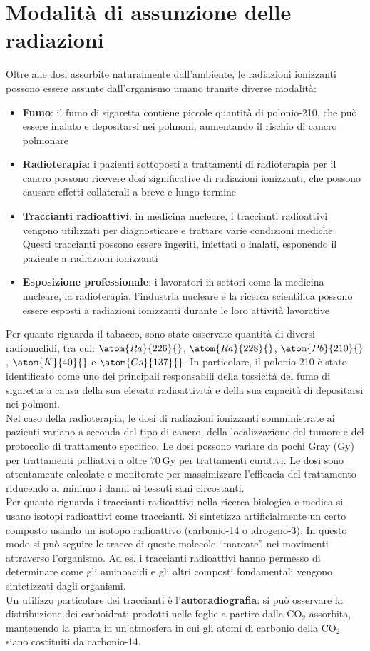 \section{Modalità di assunzione delle radiazioni}
Oltre alle dosi assorbite naturalmente dall'ambiente, le radiazioni ionizzanti possono essere assunte dall'organismo umano tramite diverse modalità:
\begin{itemize}
    \item \textbf{Fumo}: il fumo di sigaretta contiene piccole quantità di polonio-210, che può essere inalato e depositarsi nei polmoni, aumentando il rischio di cancro polmonare
    \item \textbf{Radioterapia}: i pazienti sottoposti a trattamenti di radioterapia per il cancro possono ricevere dosi significative di radiazioni ionizzanti, che possono causare effetti collaterali a breve e lungo termine
    \item \textbf{Traccianti radioattivi}: in medicina nucleare, i traccianti radioattivi vengono utilizzati per diagnosticare e trattare varie condizioni mediche. Questi traccianti possono essere ingeriti, iniettati o inalati, esponendo il paziente a radiazioni ionizzanti
    \item \textbf{Esposizione professionale}: i lavoratori in settori come la medicina nucleare, la radioterapia, l'industria nucleare e la ricerca scientifica possono essere esposti a radiazioni ionizzanti durante le loro attività lavorative
\end{itemize}
Per quanto riguarda il tabacco, sono state osservate quantità di diversi radionuclidi, tra cui: $\atom{Ra}{226}{}$, $\atom{Ra}{228}{}$, $\atom{Pb}{210}{}$, $\atom{K}{40}{}$ e $\atom{Cs}{137}{}$. In particolare, il polonio-210 è stato identificato come uno dei principali responsabili della tossicità del fumo di sigaretta a causa della sua elevata radioattività e della sua capacità di depositarsi nei polmoni.\\
Nel caso della radioterapia, le dosi di radiazioni ionizzanti somministrate ai pazienti variano a seconda del tipo di cancro, della localizzazione del tumore e del protocollo di trattamento specifico. Le dosi possono variare da pochi Gray (Gy) per trattamenti palliativi a oltre $\qty{70}{\gray}$ per trattamenti curativi. Le dosi sono attentamente calcolate e monitorate per massimizzare l'efficacia del trattamento riducendo al minimo i danni ai tessuti sani circostanti.\\
Per quanto riguarda i traccianti radioattivi nella ricerca biologica e medica si usano isotopi radioattivi come traccianti. Si sintetizza artificialmente un certo composto usando un isotopo radioattivo (carbonio-14 o idrogeno-3). In questo modo si può seguire le tracce di queste molecole ``marcate'' nei movimenti attraverso l'organismo. Ad es. i traccianti radioattivi hanno permesso di determinare come gli aminoacidi e gli altri composti fondamentali vengono sintetizzati dagli organismi.\\
Un utilizzo particolare dei traccianti è l'\textbf{autoradiografia}: si può osservare la distribuzione dei carboidrati prodotti nelle foglie a partire dalla CO$_2$ assorbita, mantenendo la pianta in un'atmosfera in cui gli atomi di carbonio della CO$_2$ siano costituiti da carbonio-14.

